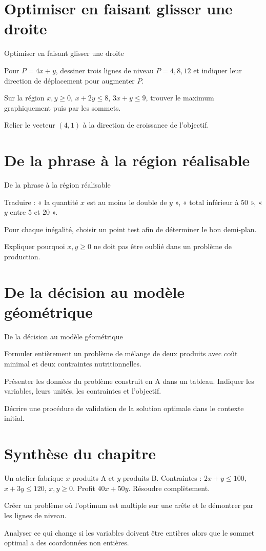 \section{Optimiser en faisant glisser une droite}
\label{workbook:section:13.05}
\begin{exerciseblock}{Optimiser en faisant glisser une droite}
\item Pour $P=4x+y$, dessiner trois lignes de niveau $P=4,8,12$ et indiquer leur direction de déplacement pour augmenter $P$.
\item Sur la région $x,y\ge0$, $x+2y\le8$, $3x+y\le9$, trouver le maximum graphiquement puis par les sommets.
\item Relier le vecteur $(4,1)$ à la direction de croissance de l'objectif.
\end{exerciseblock}
\section{De la phrase à la région réalisable}
\label{workbook:section:13.06}
\begin{exerciseblock}{De la phrase à la région réalisable}
\item Traduire : « la quantité $x$ est au moins le double de $y$ », « total inférieur à $50$ », « $y$ entre $5$ et $20$ ».
\item Pour chaque inégalité, choisir un point test afin de déterminer le bon demi-plan.
\item Expliquer pourquoi $x,y\ge0$ ne doit pas être oublié dans un problème de production.
\end{exerciseblock}
\section{De la décision au modèle géométrique}
\label{workbook:section:13.07}
\begin{exerciseblock}{De la décision au modèle géométrique}
\item Formuler entièrement un problème de mélange de deux produits avec coût minimal et deux contraintes nutritionnelles.
\item Présenter les données du problème construit en A dans un tableau. Indiquer les variables, leurs unités, les contraintes et l'objectif.
\item Décrire une procédure de validation de la solution optimale dans le contexte initial.
\end{exerciseblock}
\section*{Synthèse du chapitre}
\begin{synthesisbox}
\item Un atelier fabrique $x$ produits A et $y$ produits B. Contraintes : $2x+y\le100$, $x+3y\le120$, $x,y\ge0$. Profit $40x+50y$. Résoudre complètement.
\item Créer un problème où l'optimum est multiple sur une arête et le démontrer par les lignes de niveau.
\item Analyser ce qui change si les variables doivent être entières alors que le sommet optimal a des coordonnées non entières.
\end{synthesisbox}
